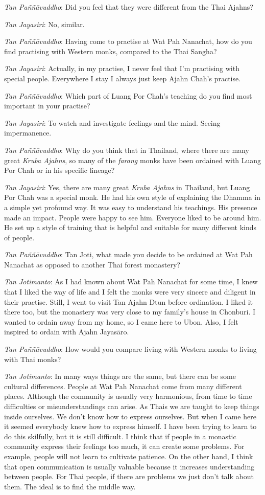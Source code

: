 \emph{Tan Paññāvuddho}: Did you feel that they were different from the
Thai Ajahns? 

\emph{Tan Jayasiri}: No, similar. 

\emph{Tan Paññāvuddho}: Having come to practise at Wat Pah Nanachat, 
how do you find practising with Western monks, compared to the Thai
Sangha? 

\emph{Tan Jayasiri}: Actually, in my practise, I never feel that I'm
practising with special people. Everywhere I stay I always just keep
Ajahn Chah's practise. 

\emph{Tan Paññāvuddho}: Which part of Luang Por Chah's teaching do you
find most important in your practise? 

\emph{Tan Jayasiri}: To watch and investigate feelings and the mind. 
Seeing impermanence. 

\emph{Tan Paññāvuddho}: Why do you think that in Thailand, where there
are many great \emph{Kruba Ajahns}, so many of the \emph{farang} monks
have been ordained with Luang Por Chah or in his specific lineage? 

\emph{Tan Jayasiri}: Yes, there are many great \emph{Kruba Ajahns}
in Thailand, but Luang Por Chah was a special monk. He had
his own style of explaining the Dhamma in a simple yet profound way. It
was easy to understand his teachings. His presence made an impact. 
People were happy to see him. Everyone liked to be around him. He set up
a style of training that is helpful and suitable for many different
kinds of people. 

\emph{Tan Paññāvuddho}: Tan Joti, what made you decide to be ordained
at Wat Pah Nanachat as opposed to another Thai forest monastery? 

\emph{Tan Jotimanto}: As I had known about Wat Pah Nanachat for some
time, I knew that I liked the way of life and I felt the monks were very
sincere and diligent in their practise. Still, I went to visit Tan Ajahn
Dtun before ordination. I liked it there too, but the monastery was very
close to my family's house in Chonburi. I wanted to ordain away from my
home, so I came here to Ubon. Also, I felt inspired to ordain with Ajahn
Jayasāro. 

\emph{Tan Paññāvuddho}: How would you compare living with Western monks
to living with Thai monks? 

\emph{Tan Jotimanto}: In many ways things are the same, but there can be
some cultural differences. People at Wat Pah Nanachat come from many
different places. Although the community is usually very harmonious, 
from time to time difficulties or misunderstandings can arise. As Thais
we are taught to keep things inside ourselves. We don't know how to
express ourselves. But when I came here it seemed everybody knew how to
express himself. I have been trying to learn to do this skilfully, but
it is still difficult. I think that if people in a monastic community
express their feelings too much, it can create some problems. For
example, people will not learn to cultivate patience. On the other hand, 
I think that open communication is usually valuable because it increases
understanding between people. For Thai people, if there are problems we
just don't talk about them. The ideal is to find the middle way. 

